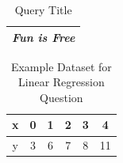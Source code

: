 \documentclass[solution]{ditpaper}
\begin{document}
\begin{table}[h]
\caption{Query Title}
\centering
\begin{tabular}{l}
\hline
\textit{Fun is Free}\\
\hline
\end{tabular}
\label{tab:spamhamquery}
\end{table}



\newpage


\begin{table}
\begin{center}
\begin{tabular}{cccccc}
\hline
x & 0 & 1 & 2 & 3 & 4\\
\hline
y & 3 & 6 & 7 & 8 & 11\\
\hline
\end{tabular}
\caption{Example Dataset for Linear Regression Question}
\label{tab:linregTab2}
\end{center}
\end{table}
\end{document}
